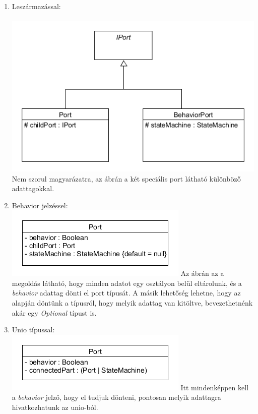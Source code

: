 \documentclass[a4paper,12pt]{report}
\begin{document}
\begin{enumerate}
\item Leszármazással: \\\\
\includegraphics[scale=0.7]{behav_generalport_diag.png} \\
Nem szorul magyarázatra, az ábrán a két speciális port látható különböző adattagokkal.
\newpage
\item Behavior jelzéssel: \\
\includegraphics[scale=0.7]{simple_port_diag.png}
Az ábrán az a megoldás látható, hogy minden adatot egy osztályon belül eltárolunk, és a \textit{behavior} adattag dönti el port típusát. A másik lehetőség lehetne, hogy az alapján döntünk a típusról, hogy melyik adattag van kitöltve, bevezethetnénk akár egy \textit{Optional} típust is. 

\item Unio típussal: \\
\includegraphics[scale=0.7]{unio_port_diag.png}
Itt mindenképpen kell a \textit{behavior} jelző, hogy el tudjuk dönteni, pontosan melyik adattagra hivatkozhatunk az unio-ból. 
\end{enumerate}
\end{document}

